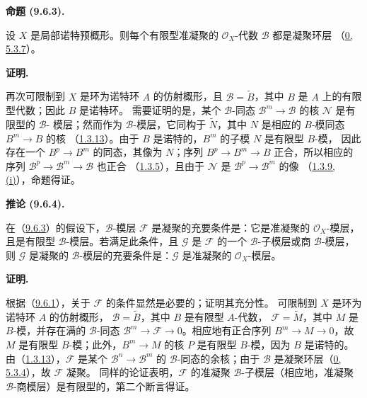 \documentclass[UTF8,fontset=none,11pt,oneside,openany]{ctexbook}
\newenvironment{proposition}[1][]{%
  \par\medskip\noindent\textbf{命题 (#1).}\ %
}{\par}
\newenvironment{corollary}[1][]{%
  \par\medskip\noindent\textbf{推论 (#1).}\ %
}{\par}
\newenvironment{proof}{%
  \par\medskip\noindent\textbf{证明.}\ %
}{\par}
\newcommand{\oldpage}[2][]{%
  \hypertarget{ega-source-page-#1-#2}{}%
  \marginnote{\scriptsize\textbf{#1}~|~#2}\ignorespaces}
\let\EGAOriginalLabel\label
\renewcommand{\label}[1]{\phantomsection\EGAOriginalLabel{#1}}
\begin{document}
\begin{proposition}[9.6.3]
\label{I.9.6.3-fr}
设 $X$ 是局部诺特预概形。则每个有限型准凝聚的
$\mathscr{O}_X$-代数 $\mathscr{B}$ 都是凝聚环层
（\hyperref[0.5.3.7-fr]{0, 5.3.7}）。
\end{proposition}

\begin{proof}
再次可限制到 $X$ 是环为诺特环 $A$ 的仿射概形，且
$\mathscr{B}=\widetilde{B}$，其中 $B$ 是 $A$ 上的有限型代数；因此 $B$ 是诺特环。
需要证明的是，某个 $\mathscr{B}$-同态 $\mathscr{B}^m\to\mathscr{B}$ 的核
$\mathscr{N}$ 是有限型的 $\mathscr{B}$-
\oldpage[I]{180}
模层；然而作为 $\mathscr{B}$-模层，它同构于
$\widetilde{N}$，其中 $N$ 是相应的 $B$-模同态 $B^m\to B$ 的核
（\hyperref[I.1.3.13-fr]{1.3.13}）。由于 $B$ 是诺特的，$B^m$ 的子模 $N$ 是有限型 $B$-模，
因此存在一个 $B^p\to B^m$ 的同态，其像为 $N$；序列
$B^p\to B^m\to B$ 正合，所以相应的序列
$\mathscr{B}^p\to\mathscr{B}^m\to\mathscr{B}$ 也正合
（\hyperref[I.1.3.5-fr]{1.3.5}），且由于 $\mathscr{N}$ 是
$\mathscr{B}^p\to\mathscr{B}^m$ 的像
（\hyperref[I.1.3.9-fr]{1.3.9, (i)}），命题得证。
\end{proof}

\begin{corollary}[9.6.4]
\label{I.9.6.4-fr}
在（\hyperref[I.9.6.3-fr]{9.6.3}）的假设下，$\mathscr{B}$-模层
$\mathscr{F}$ 是凝聚的充要条件是：它是准凝聚的 $\mathscr{O}_X$-模层，且是有限型
$\mathscr{B}$-模层。若满足此条件，且 $\mathscr{G}$ 是 $\mathscr{F}$ 的一个
$\mathscr{B}$-子模层或商 $\mathscr{B}$-模层，则 $\mathscr{G}$ 是凝聚的
$\mathscr{B}$-模层的充要条件是：$\mathscr{G}$ 是准凝聚的 $\mathscr{O}_X$-模层。
\end{corollary}

\begin{proof}
根据（\hyperref[I.9.6.1-fr]{9.6.1}），关于 $\mathscr{F}$ 的条件显然是必要的；证明其充分性。
可限制到 $X$ 是环为诺特环 $A$ 的仿射概形，
$\mathscr{B}=\widetilde{B}$，其中 $B$ 是有限型 $A$-代数，
$\mathscr{F}=\widetilde{M}$，其中 $M$ 是 $B$-模，并存在满的
$\mathscr{B}$-同态 $\mathscr{B}^m\to\mathscr{F}\to 0$。相应地有正合序列
$B^m\to M\to 0$，故 $M$ 是有限型 $B$-模；此外，$B^m\to M$ 的核 $P$ 是有限型
$B$-模，因为 $B$ 是诺特的。由（\hyperref[I.1.3.13-fr]{1.3.13}），$\mathscr{F}$ 是某个
$\mathscr{B}^n\to\mathscr{B}^m$ 的 $\mathscr{B}$-同态的余核；由于
$\mathscr{B}$ 是凝聚环层（\hyperref[0.5.3.4-fr]{0, 5.3.4}），故 $\mathscr{F}$ 凝聚。
同样的论证表明，$\mathscr{F}$ 的准凝聚 $\mathscr{B}$-子模层（相应地，准凝聚
$\mathscr{B}$-商模层）是有限型的，第二个断言得证。
\end{proof}
\end{document}
